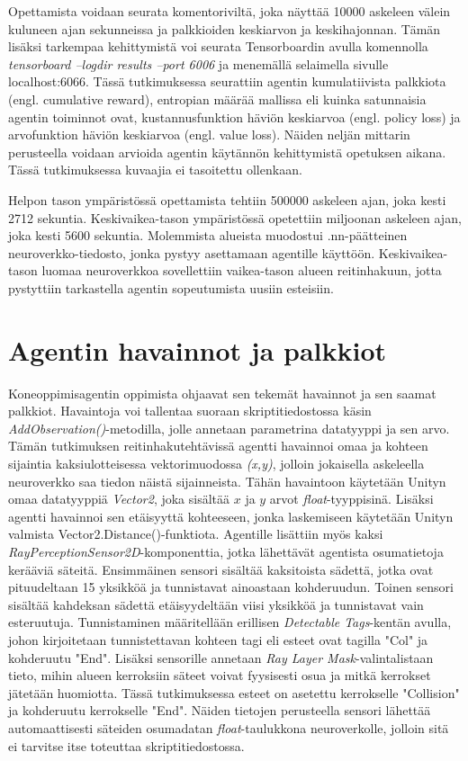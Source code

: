 \documentclass[utf8]{gradu3}
\begin{document}
Opettamista voidaan seurata komentoriviltä, joka näyttää 10000 askeleen välein kuluneen ajan sekunneissa ja palkkioiden keskiarvon ja keskihajonnan. Tämän lisäksi tarkempaa kehittymistä voi seurata Tensorboardin avulla komennolla \textit{tensorboard --logdir results --port 6006} ja menemällä selaimella sivulle localhost:6066. Tässä tutkimuksessa seurattiin agentin kumulatiivista palkkiota (engl. cumulative reward), entropian määrää mallissa eli kuinka satunnaisia agentin toiminnot ovat, kustannusfunktion häviön keskiarvoa (engl. policy loss) ja arvofunktion häviön keskiarvoa (engl. value loss). Näiden neljän mittarin perusteella voidaan arvioida agentin käytännön kehittymistä opetuksen aikana. Tässä tutkimuksessa kuvaajia ei tasoitettu ollenkaan.

Helpon tason ympäristössä opettamista tehtiin 500000 askeleen ajan, joka kesti 2712 sekuntia. Keskivaikea-tason ympäristössä opetettiin miljoonan askeleen ajan, joka kesti 5600 sekuntia. Molemmista alueista muodostui .nn-päätteinen neuroverkko-tiedosto, jonka pystyy asettamaan agentille käyttöön. Keskivaikea-tason luomaa neuroverkkoa sovellettiin vaikea-tason alueen reitinhakuun, jotta pystyttiin tarkastella agentin sopeutumista uusiin esteisiin.

\section{Agentin havainnot ja palkkiot}

Koneoppimisagentin oppimista ohjaavat sen tekemät havainnot ja sen saamat palkkiot. Havaintoja voi tallentaa suoraan skriptitiedostossa käsin \textit{AddObservation()}-metodilla, jolle annetaan parametrina datatyyppi ja sen arvo. Tämän tutkimuksen reitinhakutehtävissä agentti havainnoi omaa ja kohteen sijaintia kaksiulotteisessa vektorimuodossa \textit{(x,y)}, jolloin jokaisella askeleella neuroverkko saa tiedon näistä sijainneista. Tähän havaintoon käytetään Unityn omaa datatyyppiä \textit{Vector2}, joka sisältää \(x\) ja \(y\) arvot \textit{float}-tyyppisinä. Lisäksi agentti havainnoi sen etäisyyttä kohteeseen, jonka laskemiseen käytetään Unityn valmista Vector2.Distance()-funktiota. Agentille lisättiin myös kaksi \textit{RayPerceptionSensor2D}-komponenttia, jotka lähettävät agentista osumatietoja kerääviä säteitä. Ensimmäinen sensori sisältää kaksitoista sädettä, jotka ovat pituudeltaan 15 yksikköä ja tunnistavat ainoastaan kohderuudun. Toinen sensori sisältää kahdeksan sädettä etäisyydeltään viisi yksikköä ja tunnistavat vain esteruutuja. Tunnistaminen määritellään erillisen \textit{Detectable Tags}-kentän avulla, johon kirjoitetaan tunnistettavan kohteen tagi eli esteet ovat tagilla "Col" ja kohderuutu "End". Lisäksi sensorille annetaan \textit{Ray Layer Mask}-valintalistaan tieto, mihin alueen kerroksiin säteet voivat fyysisesti osua ja mitkä kerrokset jätetään huomiotta. Tässä tutkimuksessa esteet on asetettu kerrokselle "Collision" ja kohderuutu kerrokselle "End". Näiden tietojen perusteella sensori lähettää automaattisesti säteiden osumadatan \textit{float}-taulukkona neuroverkolle, jolloin sitä ei tarvitse itse toteuttaa skriptitiedostossa.
\end{document}
